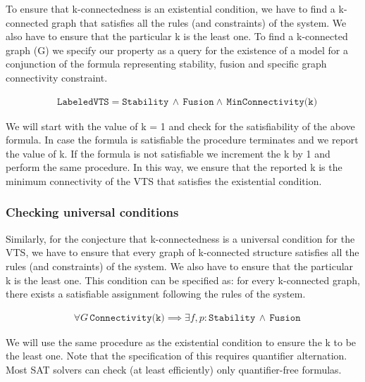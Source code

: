 To ensure that k-connectedness is an existential condition, we have to find a k-connected graph that satisfies all the rules (and constraints) of the system. 
%
We also have to ensure that the particular k is the least one. 
%
%
To find a k-connected graph (G) we specify our property as a query for the existence of a model for a conjunction of the formula representing stability, fusion and specific graph connectivity constraint. 
%

\begin{align*}
  &\texttt{LabeledVTS} = \texttt{Stability} \, \land \, \texttt{Fusion} \land \, \texttt{MinConnectivity(k)}
 \tag{E}\label{eq:existcond}
\end{align*}

We will start with the value of k = 1 and check for the satisfiability of the above formula.
%
In case the formula is satisfiable the procedure terminates and we report the value of k. 
%
If the formula is not satisfiable we increment the k by 1 and perform the same procedure. 
%
In this way, we ensure that the reported k is the minimum connectivity of the VTS that satisfies the existential condition.  


\subsubsection{Checking universal conditions}

Similarly, for the conjecture that k-connectedness is a universal condition for the VTS, we have to ensure that every graph of k-connected structure satisfies all the rules (and constraints) of the system. 
%
We also have to ensure that the particular k is the least one. 
%
This condition can be specified as: for every k-connected graph, there exists a satisfiable assignment following the rules of the system. 

\begin{align*}
  & \forall G \, \texttt{Connectivity(k)} \implies  \exists
                        f,p: \texttt{Stability} \, \land \, \texttt{Fusion}  
  \tag{U}\label{eq:univcond}
\end{align*}

We will use the same procedure as the existential condition to ensure the k to be the least one.
%
Note that the specification of this requires quantifier alternation. 
%
Most SAT solvers can check (at least efficiently) only quantifier-free formulas. 
%




          
